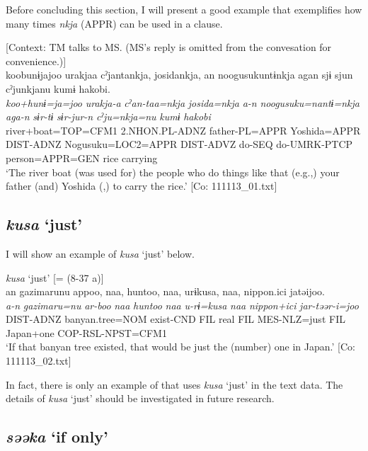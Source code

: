   Before concluding this section, I will present a good example that exemplifies how many times \textit{nkja} (APPR) can be used in a clause.

\ea\label{ex:10.27}   [Context: TM talks to MS. (MS’s reply is omitted from the convesation for convenience.)]\\
      \glll    koobunɨjajoo  urakjaa  cˀjantankja,  josidankja,  an  noogusukuntɨnkja  agan  sjɨ  sjun  cˀjunkjanu  kumɨ  {\textbar}hakobi{\textbar}.\\
    \textit{koo+hunɨ=ja=joo}  \textit{urakja-a}  \textit{cˀan-taa=nkja}  \textit{josida=nkja}  \textit{a-n}  \textit{noogusuku=nantɨ=nkja}  \textit{aga-n}  \textit{sɨr-tɨ}  \textit{sɨr-jur-n}  \textit{cˀju=nkja=nu}  \textit{kumɨ}  \textit{hakobi}\\
    river+boat=TOP=CFM1  2.NHON.PL-ADNZ  father-PL=APPR  Yoshida=APPR  DIST-ADNZ  Nogusuku=LOC2=APPR  DIST-ADVZ  do-SEQ  do-UMRK-PTCP  person=APPR=GEN  rice  carrying\\
\glt     ‘The river boat (was used for) the people who do things like that (e.g.,) your father (and) Yoshida (,) to carry the rice.’  [Co: 111113\_01.txt]
\z

\subsection{\textit{kusa} ‘just’}\label{sec:10.1.7}

I will show an example of \textit{kusa} ‘just’ below.

\ea\label{ex:10.28}   \textit{kusa} ‘just’ [= (8-37 a)]\\
      \glll    an  gazimarunu  appoo,  naa,  huntoo,  naa,   urɨkusa,  naa,  {\textbar}nippon.ici{\textbar}  jatəijoo.\\
    \textit{a-n}  \textit{gazimaru=nu}  \textit{ar-boo}  \textit{naa}  \textit{huntoo}  \textit{naa} \textit{u-rɨ=kusa}  \textit{naa}  \textit{nippon+ici}  \textit{jar-təər-i=joo}\\
    DIST-ADNZ  banyan.tree=NOM  exist-CND  FIL  real  FIL MES-NLZ=just  FIL  Japan+one  COP-RSL-NPST=CFM1\\
\glt     ‘If that banyan tree existed, that would be just the (number) one in Japan.’  [Co: 111113\_02.txt]
\z

In fact, there is only an example of  that uses \textit{kusa} ‘just’ in the text data. The details of \textit{kusa} ‘just’ should be investigated in future research.

\subsection{\textit{səəka} ‘if only’}\label{sec:10.1.8}


